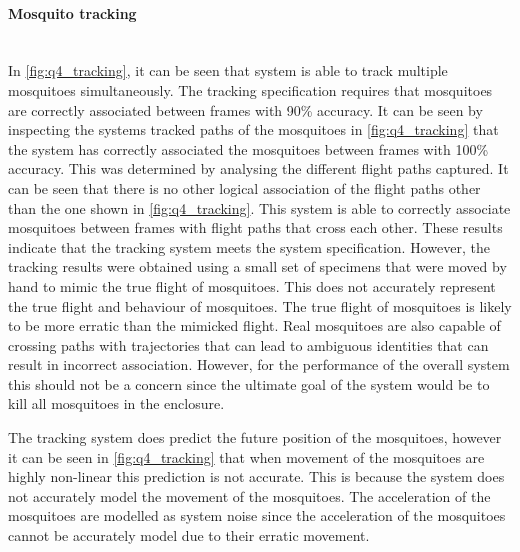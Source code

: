 \paragraph{Mosquito tracking}\hfill\\
In \autoref{fig:q4_tracking}, it can be seen that system is able to track multiple mosquitoes simultaneously. The tracking specification requires that mosquitoes are correctly associated between frames with 90\% accuracy. It can be seen by inspecting the systems tracked paths of the mosquitoes in \autoref{fig:q4_tracking} that the system has correctly associated the mosquitoes between frames with 100\% accuracy. This was determined by analysing the different flight paths captured. It can be seen that there is no other logical association of the flight paths other than the one shown in \autoref{fig:q4_tracking}. This system is able to correctly associate mosquitoes between frames with flight paths that cross each other. These results indicate that the tracking system meets the system specification. However, the tracking results were obtained using a small set of specimens that were moved by hand to mimic the true flight of mosquitoes. This does not accurately represent the true flight and behaviour of mosquitoes. The true flight of mosquitoes is likely to be more erratic than the mimicked flight. Real mosquitoes are also capable of crossing paths with trajectories that can lead to ambiguous identities that can result in incorrect association. However, for the performance of the overall system this should not be a concern since the ultimate goal of the system would be to kill all mosquitoes in the enclosure.

The tracking system does predict the future position of the mosquitoes, however it can be seen in \autoref{fig:q4_tracking} that when movement of the mosquitoes are highly non-linear this prediction is not accurate. This is because the system does not accurately model the movement of the mosquitoes. The acceleration of the mosquitoes are modelled as system noise since the acceleration of the mosquitoes cannot be accurately model due to their erratic movement.

